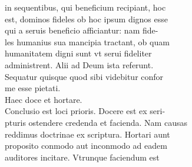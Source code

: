 \documentclass{article}
\begin{document}
\begin{pages}
                in sequentibus, qui beneficium recipiant, hoc \\
                est, dominos fideles ob hoc ipsum dignos esse \\
                qui a seruis beneficio afficiantur: nam fide- \\
                les humanius sua mancipia tractant, ob quam \\
                humanitatem digni sunt vt serui fideliter \\
                administrent. Alii ad Deum ista referunt. \\
                Sequatur quisque quod sibi videbitur confor \\
                me esse pietati. \\
                Haec doce et hortare. \\
                Conclusio est loci prioris. Docere est ex seri- \\
                pturis ostendere credenda et facienda. Nam causas \\
                reddimus doctrinae ex scriptura. Hortari aunt \\
                proposito conmodo aut inconmodo ad eadem \\
                auditores incitare. Vtrunque faciendum est \\
                

\end{pages}
\end{document}
